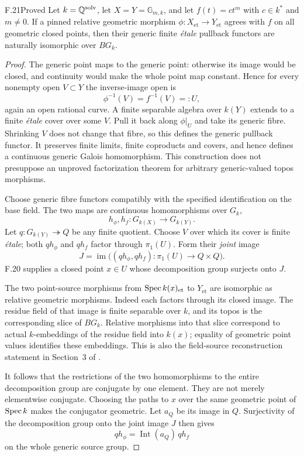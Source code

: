 \begin{claim}{F.21}{Proved}
Let $k=\mathbb Q^{\mathrm{solv}}$, let $X=Y=\mathbb G_{m,k}$, and
let $f(t)=ct^m$ with $c\in k^*$ and $m\ne0$. If a pinned
relative geometric morphism
$\phi:X_{\mathrm{et}}\to Y_{\mathrm{et}}$ agrees with $f$ on
all geometric closed points, then their generic finite
\emph{\'etale} pullback functors are naturally isomorphic over
$BG_k$.
\end{claim}
\begin{proof}
The generic point maps to the generic point: otherwise its image
would be closed, and continuity would make the whole point map
constant. Hence for every nonempty open $V\subset Y$ the
inverse-image open is
\[
 \phi^{-1}(V)=f^{-1}(V)=:U,
\]
again an open rational curve. A finite separable algebra over
$k(Y)$ extends to a finite \emph{\'etale} cover over some $V$.
Pull it back along $\phi|_U$ and take its generic fibre.
Shrinking $V$ does not change that fibre, so this defines the
generic pullback functor. It preserves finite limits, finite
coproducts and covers, and hence defines a continuous generic
Galois homomorphism. This construction does not presuppose an
unproved factorization theorem for arbitrary generic-valued
topos morphisms.

Choose generic fibre functors compatibly with the specified
identification on the base field. The two maps are continuous
homomorphisms over $G_k$,
\[
 h_\phi,h_f:G_{k(X)}\longrightarrow G_{k(Y)}.
\]
Let $q:G_{k(Y)}\twoheadrightarrow Q$ be any finite quotient.
Choose $V$ over which its cover is finite \emph{\'etale}; both
$q h_\phi$ and $q h_f$ factor through $\pi_1(U)$. Form their
\emph{joint} image
\[
 J=\operatorname{im}\bigl((q h_\phi,q h_f):
                   \pi_1(U)\to Q\times Q\bigr).
\]
F.20 supplies a closed point $x\in U$ whose decomposition group
surjects onto $J$.

The two point-source morphisms from
$\operatorname{Spec} k(x)_{\mathrm{et}}$ to $Y_{\mathrm{et}}$ are isomorphic
as relative geometric morphisms. Indeed each factors through its
closed image. The residue field of that image is finite separable
over $k$, and its topos is the corresponding slice of $BG_k$.
Relative morphisms into that slice correspond to actual
$k$-embeddings of the residue field into $k(x)$; equality of
geometric point values identifies these embeddings. This is also
the field-source reconstruction statement in Section~3 of
\citet{F_CHW2024}.

It follows that the restrictions of the two homomorphisms to the
entire decomposition group are conjugate by one element. They
are not merely elementwise conjugate. Choosing the paths to
$x$ over the same geometric point of $\operatorname{Spec} k$ makes the
conjugator geometric. Let $a_Q$ be its image in $Q$.
Surjectivity of the decomposition group onto the joint image $J$
then gives
\[
 q h_\phi=\operatorname{Int}(a_Q)\,q h_f
\]
on the whole generic source group.


\end{proof}
